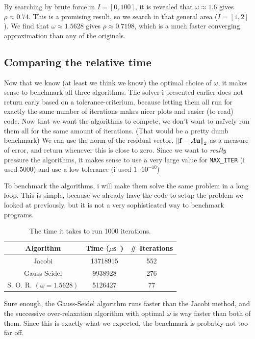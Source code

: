 \documentclass[12pt]{article}
\begin{document}
\begin{multicols*}{2}
    By searching by brute force in $I = [0, 100]$,
    it is revealed that $\omega \approx 1.6$ gives $\rho \approx 0.74$.
    This is a promising result, so we search in that general area
    ($I = [1, 2]$). We find that $\omega \approx 1.5628$ gives
    $\rho \approx 0.7198$, which is a much faster converging
    approximation than any of the originals.

    \subsection{Comparing the relative time}
    Now that we know (at least we think we know) the optimal
    choice of $\omega$, it makes sense to benchmark all three algorithms.
    The solver i presented earlier does not return early based on a
    tolerance-criterium, because letting them all run for exactly the same
    number of iterations makes nicer plots and easier (to read) code.
    Now that we want the algorithms to compete, we don't want to na\"ively
    run them all for the same amount of iterations.
    (That would be a pretty dumb benchmark)
    We can use the norm of the residual vector,
    $\Norm[2]{\vec f - A \vec u}$ as a measure of error,
    and return whenever this is close to zero.
    Since we want to {\em really} pressure the algorithms,
    it makes sense to use a very large value for {\tt MAX\_ITER} (i used $5000$)
    and use a low tolerance (i used $1 \cdot 10^{-10}$)

    To benchmark the algorithms, i will make them solve the same
    problem in a long loop. This is simple, because we already have
    the code to setup the problem we looked at previously, but it
    is not a very sophisticated way to benchmark programs.
    \begin{table}[H]
        \centering
        \caption{The time it takes to run 1000 iterations.}
        \begin{tabular}{ccc}
            \hline\hline
            \bfseries Algorithm & \bfseries Time ($\mu$\si s) &\bfseries \# Iterations \\
            \hline
            Jacobi                       & 13718915 & 552\\
            Gauss-Seidel                 & 9938928 & 276 \\
            S. O. R. $(\omega = 1.5628)$ & 5126427 & 77 \\
            \hline
        \end{tabular}
        \label{table:rhos}
    \end{table}\noindent
    Sure enough, the Gauss-Seidel algorithm runs faster than the Jacobi
    method, and the successive over-relaxation algorithm with optimal
    $\omega$ is way faster than both of them.
    Since this is exactly what we expected, the benchmark is probably
    not too far off.



\end{multicols*}
\end{document}

